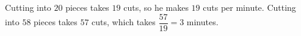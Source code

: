Cutting into $20$ pieces takes $19$ cuts, so he makes $19$ cuts per minute. Cutting into $58$ pieces takes $57$ cuts, which takes $\dfrac{57}{19}=\boxed{3}$ minutes.
